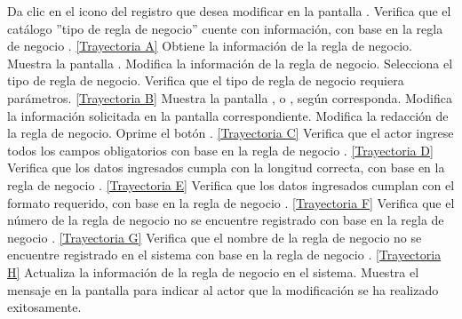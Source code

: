 	\begin{UCtrayectoria}
		\UCpaso[\UCactor] Da clic en el icono \editar del registro que desea modificar en la pantalla .
		\UCpaso[\UCsist] Verifica que el catálogo ''tipo de regla de negocio'' cuente con información, con base en la regla de negocio . \hyperlink{CU8-2:TAA}{[Trayectoria A]}
		\UCpaso[\UCsist] Obtiene la información de la regla de negocio.
		\UCpaso[\UCsist] Muestra la pantalla .
		\UCpaso[\UCactor] Modifica la información de la regla de negocio. \label{CU8.2-P5}
		\UCpaso[\UCactor] Selecciona el tipo de regla de negocio.
		\UCpaso[\UCsist] Verifica que el tipo de regla de negocio requiera parámetros. \hyperlink{CU8-2:TAB}{[Trayectoria B]}
		\UCpaso[\UCsist] Muestra la pantalla ,  o , según corresponda.
		\UCpaso[\UCactor] Modifica la información solicitada en la pantalla correspondiente.
		\UCpaso[\UCactor] Modifica la redacción de la regla de negocio. \label{CU8.2-P11}
		\UCpaso[\UCactor] Oprime el botón . \hyperlink{CU8-2:TAC}{[Trayectoria C]}
		\UCpaso[\UCsist] Verifica que el actor ingrese todos los campos obligatorios con base en la regla de negocio . \hyperlink{CU8-2:TAD}{[Trayectoria D]}
		\UCpaso[\UCsist] Verifica que los datos ingresados cumpla con la longitud correcta, con base en la regla de negocio . \hyperlink{CU8-2:TAE}{[Trayectoria E]}
		\UCpaso[\UCsist] Verifica que los datos ingresados cumplan con el formato requerido, con base en la regla de negocio . \hyperlink{CU8-2:TAF}{[Trayectoria F]}
		\UCpaso[\UCsist] Verifica que el número de la regla de negocio no se encuentre registrado con base en la regla de negocio . \hyperlink{CU8-2:TAG}{[Trayectoria G]}
		\UCpaso[\UCsist] Verifica que el nombre de la regla de negocio no se encuentre registrado en el sistema con base en la regla de negocio . \hyperlink{CU8-2:TAH}{[Trayectoria H]}
		\UCpaso[\UCsist] Actualiza la información de la regla de negocio en el sistema.
		\UCpaso[\UCsist] Muestra el mensaje  en la pantalla  para indicar al actor que la modificación se ha realizado exitosamente.
	\end{UCtrayectoria}		
